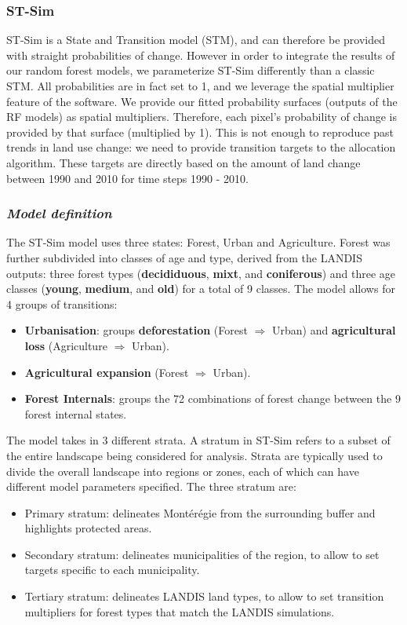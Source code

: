 \subsubsection*{ST-Sim}

ST-Sim is a State and Transition model (STM), and can therefore be provided with straight probabilities of change. However in order to integrate the results of our random forest models, we parameterize ST-Sim differently than a classic STM. All probabilities are in fact set to 1, and we leverage the spatial multiplier feature of the software. We provide our fitted probability surfaces (outputs of the RF models) as spatial multipliers. Therefore, each pixel's probability of change is provided by that surface (multiplied by 1).  This is not enough to reproduce past trends in land use change: we need to provide transition targets to the allocation algorithm. These targets are directly based on the amount of land change between 1990 and 2010 for time steps 1990 - 2010.\\

\subsubsection*{\textit{Model definition}}

The ST-Sim model uses three states: Forest, Urban and Agriculture. Forest was further subdivided into classes of age and type, derived from the LANDIS outputs: three forest types (\textbf{decididuous}, \textbf{mixt}, and \textbf{coniferous}) and three age classes (\textbf{young}, \textbf{medium}, and \textbf{old}) for a total of 9 classes.
The model allows for 4 groups of transitions:
\begin{itemize}
\item{\textbf{Urbanisation}}: groups \textbf{deforestation} (Forest $\Rightarrow$ Urban) and \textbf{agricultural loss} (Agriculture $\Rightarrow$ Urban). 
\item{\textbf{Agricultural expansion}} (Forest $\Rightarrow$ Urban).
\item{\textbf{Forest Internals}}: groups the 72 combinations of forest change between the 9 forest internal states.
\end{itemize} 
The model takes in 3 different strata. A stratum in ST-Sim refers to a subset of the entire landscape being considered for analysis. Strata are typically used to divide the overall landscape into regions or zones, each of which can have different model parameters specified. The three stratum are:
\begin{itemize}
\item{Primary stratum:} delineates Montérégie from the  surrounding buffer and highlights protected areas. 
\item{Secondary stratum:} delineates municipalities of the region, to allow to set targets specific to each municipality.  
\item{Tertiary stratum:} delineates LANDIS land types, to allow to set transition multipliers for forest types that match the LANDIS simulations. \\
\end{itemize}


